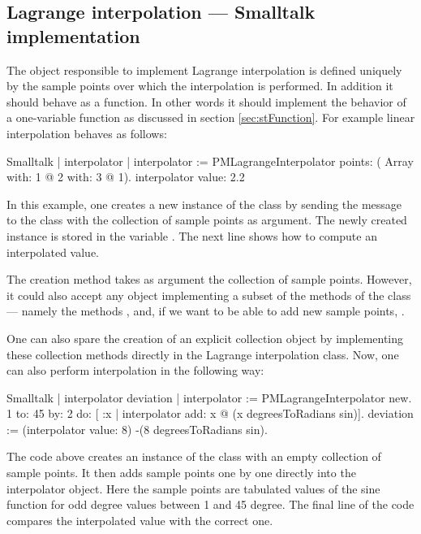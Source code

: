 \subsection{Lagrange interpolation --- Smalltalk implementation}
\label{sec:slagrange} The object
responsible to implement Lagrange interpolation is defined
uniquely by the sample points over which the interpolation is
performed. In addition it should behave as a function. In other
words it should implement the behavior of a one-variable function
as discussed in section \ref{sec:stFunction}. For example linear
interpolation behaves as follows:

\begin{listing}[label=ex:lagrangeS1]{Smalltalk}
| interpolator |
interpolator := PMLagrangeInterpolator points: ( Array with: 1 @ 2
                                                    with: 3 @ 1).
interpolator value: 2.2
\end{listing}

In this example, one creates a new instance of the class  by sending the message  to the class  with the collection of
sample points as argument.
The newly created instance is stored in the variable .
The next line shows how to compute an interpolated value.

The creation method  takes as argument the collection
of sample points. However, it could also accept any object
implementing a subset of the methods of the class 
--- namely the methods ,  and, if we want to be
able to add new sample points, .

One can also spare the creation of an explicit collection object
by implementing these collection methods directly in the Lagrange
interpolation class.
Now, one can also perform interpolation in the following way:
\begin{displaycode}[label=ex:lagrangeS2]{Smalltalk}
 | interpolator deviation |
 interpolator := PMLagrangeInterpolator new.
 1 to: 45 by: 2 do:
                [ :x | interpolator add: x @ (x degreesToRadians sin)].
 deviation := (interpolator value: 8) -(8 degreesToRadians sin).
\end{displaycode}
The code above creates an instance of the class  with an empty collection of sample points. It then adds sample points one by one directly into the
interpolator object. Here the sample points are tabulated values
of the sine function for odd degree values between 1 and 45
degree. The final line of the code compares the interpolated value
with the correct one.

